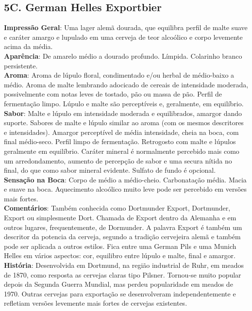 \subsection*{5C. German Helles Exportbier}
\textbf{Impressão Geral}: Uma lager alemã dourada, que equilibra perfil de malte suave e caráter amargo e lupulado em uma cerveja de teor alcoólico e corpo levemente acima da média. \\
\textbf{Aparência}: De amarelo médio a dourado profundo. Límpida. Colarinho branco persistente. \\
\textbf{Aroma}: Aroma de lúpulo floral, condimentado e/ou herbal de médio-baixo a médio. Aroma de malte lembrando adocicado de cereais de intensidade moderada, possivelmente com notas leves de tostado, pão ou massa de pão. Perfil de fermentação limpo. Lúpulo e malte são perceptíveis e, geralmente, em equilíbrio. \\
\textbf{Sabor}: Malte e lúpulo em intensidade moderada e equilibrados, amargor dando suporte. Sabores de malte e lúpulo similar ao aroma (com os mesmos descritores e intensidades). Amargor perceptível de média intensidade, cheia na boca, com final médio-seco. Perfil limpo de fermentação. Retrogosto com malte e lúpulos geralmente em equilíbrio. Caráter mineral é normalmente percebido mais como um arredondamento, aumento de percepção de sabor e uma secura nítida no final, do que como sabor mineral evidente. Sulfato de fundo é opcional. \\
\textbf{Sensação na Boca}: Corpo de médio a médio-cheio. Carbonatação média. Macia e suave na boca. Aquecimento alcoólico muito leve pode ser percebido em versões mais fortes. \\
\textbf{Comentários}: Também conhecida como Dortmunder Export, Dortmunder, Export ou simplesmente Dort. Chamada de Export dentro da Alemanha e em outros lugares, frequentemente, de Dormunder. A palavra Export é também um descritor da potencia da cerveja, segundo a tradição cervejeira alemã e também pode ser aplicada a outros estilos. Fica entre uma German Pils e uma Munich Helles em vários aspectos: cor, equilibro entre lúpulo e malte, final e amargor. \\
\textbf{História}: Desenvolvida em Dortmund, na região industrial de Ruhr, em meados de 1870, como resposta as cervejas claras tipo Pilsner. Tornou-se muito popular depois da Segunda Guerra Mundial, mas perdeu popularidade em meados de 1970. Outras cervejas para exportação se desenvolveram independentemente e refletiam versões levemente mais fortes de cervejas existentes. \\
